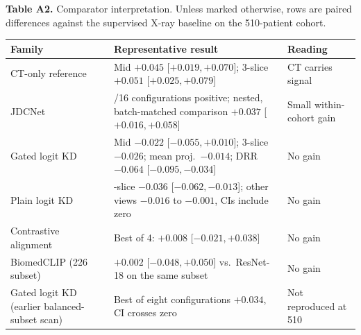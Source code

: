 \documentclass[pdflatex,sn-vancouver,Numbered]{sn-jnl}
\begin{document}
\begin{minipage}{\textwidth}
{\small\noindent\textbf{Table A2.} Comparator interpretation. Unless marked otherwise, rows are paired differences against the supervised X-ray baseline on the 510-patient cohort.\par}
\vspace{6pt}


\centering
\scriptsize
\setlength{\tabcolsep}{2.5pt}
\renewcommand{\arraystretch}{0.9}
\begin{tabularx}{\columnwidth}{@{}>{\raggedright\arraybackslash}p{}>{\raggedright\arraybackslash}p{}>{\raggedright\arraybackslash}X@{}}
\toprule
Family & Representative result & Reading \\
\midrule
CT-only reference & Mid $+0.045$ [$+0.019,+0.070$]; 3-slice $+0.051$ [$+0.025,+0.079$] & CT carries signal \\
JDCNet & 15/16 configurations positive; nested, batch-matched comparison $+0.037$ [$+0.016,+0.058$] & Small within-cohort gain \\
Gated logit KD & Mid $-0.022$ [$-0.055,+0.010$]; 3-slice $-0.026$; mean proj.\ $-0.014$; DRR $-0.064$ [$-0.095,-0.034$] & No gain \\
Plain logit KD & 3-slice $-0.036$ [$-0.062,-0.013$]; other views $-0.016$ to $-0.001$, CIs include zero & No gain \\
Contrastive alignment & Best of 4: $+0.008$ [$-0.021,+0.038$] & No gain \\
BiomedCLIP (226 subset) & $+0.002$ [$-0.048,+0.050$] vs.\ ResNet-18 on the same subset & No gain \\
Gated logit KD (earlier balanced-subset scan) & Best of eight configurations $+0.034$, CI crosses zero & Not reproduced at 510 \\
\bottomrule
\end{tabularx}
\end{minipage}
\clearpage
\end{document}
